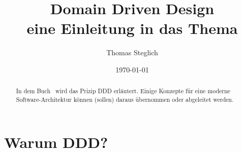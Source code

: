 \documentclass[11pt,a4paper]{scrartcl}
\begin{document}
\graphicspath{{./images/}} %

\title{Domain Driven Design\\ \small eine Einleitung in das Thema}
\author{Thomas Steglich}
\date{\today}

\maketitle

\begin{abstract}
	\noindent In dem Buch~\cite[Domain Driven Design(DDD)]{dddp} wird das Prizip DDD erläutert. Einige Konzepte für eine moderne Software-Architektur können (sollen) daraus übernommen oder abgeleitet werden.
\end{abstract}

\pagestyle{fancy} %
\chead{} %
\rhead{\rightmark} %
\cfoot{\thepage} %
\rfoot{\today} %
\renewcommand\headrulewidth{1pt} %
\renewcommand\footrulewidth{1pt} %

\newpage %
\tableofcontents %
\newpage %

\section{Warum DDD?}
\end{document}
